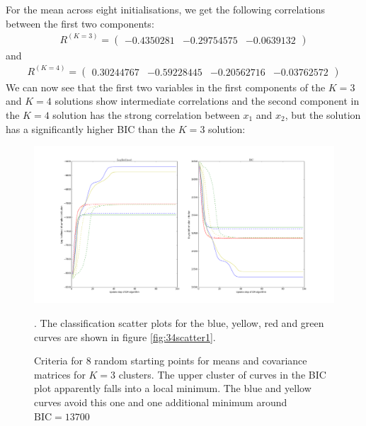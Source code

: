 For the mean across eight initialisations, we get the following correlations between the first two components:
\begin{align}
R^{(K=3)} = \begin{pmatrix}
-0.4350281 & -0.29754575 & -0.0639132
\end{pmatrix}
\end{align}
and
\begin{align}
R^{(K=4)} = \begin{pmatrix}
0.30244767 & -0.59228445 & -0.20562716 & -0.03762572
\end{pmatrix}
\end{align}
We can now see that the first two variables in the first components of the $K=3$ and $K=4$ solutions show intermediate correlations and the second component in the $K=4$ solution has the strong correlation between $x_1$ and $x_2$, but the solution has a significantly higher BIC than the $K=3$ solution:

\begin{figure}[H]
	\centering \includegraphics{../Figures/Ex3_4_llh1.png}
	\caption{Criteria for 8 random starting points for means and covariance matrices for $K=3$ clusters. The upper cluster of curves in the BIC plot apparently falls into a local minimum. The blue and yellow curves avoid this one and one additional minimum around $\mathrm{BIC}=13700$}. The classification scatter plots for the blue, yellow, red and green curves are shown in figure \ref{fig:34scatter1}.
	\label{fig:34llh1}
\end{figure}

